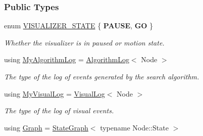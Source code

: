 \subsubsection*{Public Types}
\begin{DoxyCompactItemize}
\item 
enum \hyperlink{structslb_1_1core_1_1ui_1_1VisualizerData_a38e4b90b6d4faae3c15629f715440ad9}{V\+I\+S\+U\+A\+L\+I\+Z\+E\+R\+\_\+\+S\+T\+A\+TE} \{ {\bfseries P\+A\+U\+SE}, 
{\bfseries GO}
 \}\hypertarget{structslb_1_1core_1_1ui_1_1VisualizerData_a38e4b90b6d4faae3c15629f715440ad9}{}\label{structslb_1_1core_1_1ui_1_1VisualizerData_a38e4b90b6d4faae3c15629f715440ad9}
\begin{DoxyCompactList}\small\item\em Whether the visualizer is in paused or motion state. \end{DoxyCompactList}
\item 
using \hyperlink{structslb_1_1core_1_1ui_1_1VisualizerData_a60b2b55373e9d9cb92c608468264b7d4}{My\+Algorithm\+Log} = \hyperlink{structslb_1_1core_1_1ui_1_1AlgorithmLog}{Algorithm\+Log}$<$ Node $>$\hypertarget{structslb_1_1core_1_1ui_1_1VisualizerData_a60b2b55373e9d9cb92c608468264b7d4}{}\label{structslb_1_1core_1_1ui_1_1VisualizerData_a60b2b55373e9d9cb92c608468264b7d4}

\begin{DoxyCompactList}\small\item\em The type of the log of events generated by the search algorithm. \end{DoxyCompactList}\item 
using \hyperlink{structslb_1_1core_1_1ui_1_1VisualizerData_a8a0541173fd569040f6ce87436f984df}{My\+Visual\+Log} = \hyperlink{structslb_1_1core_1_1ui_1_1VisualLog}{Visual\+Log}$<$ Node $>$\hypertarget{structslb_1_1core_1_1ui_1_1VisualizerData_a8a0541173fd569040f6ce87436f984df}{}\label{structslb_1_1core_1_1ui_1_1VisualizerData_a8a0541173fd569040f6ce87436f984df}

\begin{DoxyCompactList}\small\item\em The type of the log of visual events. \end{DoxyCompactList}\item 
using \hyperlink{structslb_1_1core_1_1ui_1_1VisualizerData_ac053f3f7f383071070455ee49e4c9443}{Graph} = \hyperlink{structslb_1_1core_1_1ui_1_1StateGraph}{State\+Graph}$<$ typename Node\+::\+State $>$\hypertarget{structslb_1_1core_1_1ui_1_1VisualizerData_ac053f3f7f383071070455ee49e4c9443}{}\label{structslb_1_1core_1_1ui_1_1VisualizerData_ac053f3f7f383071070455ee49e4c9443}


\end{DoxyCompactItemize}
